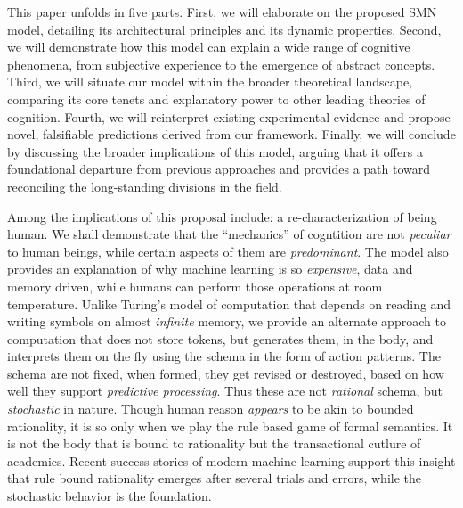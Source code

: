 This paper unfolds in five parts. First, we will elaborate on the proposed SMN model, detailing its architectural principles and its dynamic properties. Second, we will demonstrate how this model can explain a wide range of cognitive phenomena, from subjective experience to the emergence of abstract concepts. Third, we will situate our model within the broader theoretical landscape, comparing its core tenets and explanatory power to other leading theories of cognition. Fourth, we will reinterpret existing experimental evidence and propose novel, falsifiable predictions derived from our framework. Finally, we will conclude by discussing the broader implications of this model, arguing that it offers a foundational departure from previous approaches and provides a path toward reconciling the long-standing divisions in the field.

Among the implications of this proposal include: a re-characterization of being human. We shall demonstrate that the ``mechanics'' of cogntition are not \textit{peculiar} to human beings, while certain aspects of them are \textit{predominant}. The model also provides an explanation of why machine learning is so \textit{expensive}, data and memory driven, while humans can perform those operations at room temperature. Unlike Turing's model of computation that depends on reading and writing symbols on almost \textit{infinite} memory, we provide an alternate approach to computation that does not store tokens, but generates them, in the body, and interprets them on the fly using the schema in the form of action patterns. The schema are not fixed, when formed, they get revised or destroyed, based on how well they support \textit{predictive processing}. Thus these are not \textit{rational} schema, but \textit{stochastic} in nature. Though human reason \textit{appears} to be akin to bounded rationality, it is so only when we play the rule based game of formal semantics. It is not the body that is bound to rationality but the transactional cutlure of academics. Recent success stories of modern machine learning support this insight that rule bound rationality emerges after several trials and errors, while the stochastic behavior is the foundation. 
